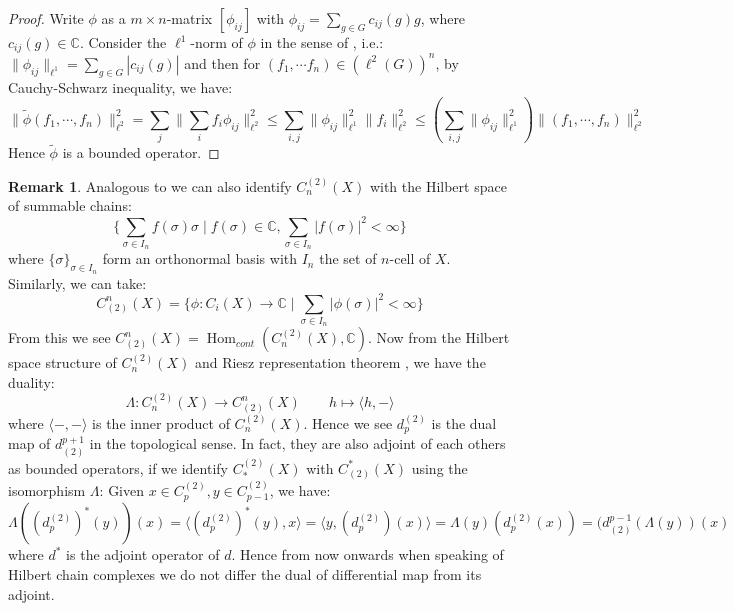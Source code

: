 \documentclass[11pt]{report}
\theoremstyle{definition}
\newtheorem{Rmk}{Remark}[chapter]
\theoremstyle{plain}
\DeclareMathOperator{\Hom}{Hom}
\newcommand{\complex}{\mathbb{C}}
\newcommand{\brac}[1]{\langle #1 \rangle}
\newcommand{\norm}[1]{\lVert #1 \rVert}
\renewcommand{\tilde}{\widetilde}
\begin{document}
\begin{proof}
	Write $\phi$ as a $m\times n$-matrix $[\phi_{ij}]$ with $\phi_{ij}=\sum_{g\in G}c_{ij}(g)g$, where $c_{ij}(g)\in \complex$. Consider the $\ell^1$-norm of $\phi$ in the sense of , i.e.: $\norm{\phi_{ij}}_{\ell^1}=\sum_{g\in G}|c_{ij}(g)|$ and then for $(f_1, \cdots f_n)\in (\ell^2(G))^n$, by Cauchy-Schwarz inequality, we have:
	\begin{equation*}
	\norm{\tilde{\phi}(f_1, \cdots, f_n)}_{\ell^2}^2=\sum_j\norm{\sum_i f_i\phi_{ij}}^2_{\ell^2}\leq \sum_{i,j}\norm{\phi_{ij}}^2_{\ell^1}\norm{f_i}^2_{\ell^2}\leq (\sum_{i,j}\norm{\phi_{ij}}^2_{\ell^1})\norm{(f_1, \cdots, f_n)}^2_{\ell^2}
	\end{equation*}
	Hence $\tilde{\phi}$ is a bounded operator. 
\end{proof}
\begin{Rmk}\label{ell2fct2}
	Analogous to  we can also identify $C^{(2)}_n(X)$ with the Hilbert space of summable chains:
	\begin{equation}
	\{\sum_{\sigma\in I_n}f(\sigma)\sigma\mid f(\sigma)\in \complex, \sum_{\sigma\in I_n} |f(\sigma)|^2<\infty\}
	\end{equation}
	where $\{\sigma\}_{\sigma\in I_n}$ form an orthonormal basis with $I_n$ the set of $n$-cell of $X$. Similarly, we can take:
	\begin{equation}
	C^n_{(2)}(X)=\{\phi:C_i(X)\to \complex\mid \sum_{\sigma\in I_n}|\phi(\sigma)|^2<\infty\}
	\end{equation}
	From this we see $C^n_{(2)}(X)=\Hom_{cont}(C_n^{(2)}(X), \complex)$. Now from the Hilbert space structure of $C_n^{(2)}(X)$ and Riesz representation theorem \cite[Chapter~I, Theorem~3.4]{conway2013}, we have the duality:
	\begin{equation}
	\Lambda: C^{(2)}_n(X)\to C^n_{(2)}(X)\qquad h\mapsto \brac{h,-}
	\end{equation}
	where $\brac{-,-}$ is the inner product of $C^{(2)}_n(X)$. Hence we see $d_p^{(2)}$ is the dual map of $d^{p+1}_{(2)}$ in the topological sense. In fact, they are also adjoint of each others as bounded operators, if we identify $C^{(2)}_*(X)$ with $C_{(2)}^*(X)$ using the isomorphism $\Lambda$: Given $x\in C^{(2)}_p, y\in C^{(2)}_{p-1}$, we have:
\begin{equation}
\Lambda((d_p^{(2)})^*(y))(x)=\brac{(d_p^{(2)})^*(y),x}=\brac{y,(d_p^{(2)})(x)}=\Lambda(y)(d_p^{(2)}(x))=(d^{p-1}_{(2)}(\Lambda(y))(x)
\end{equation}
where $d^*$ is the adjoint operator of $d$. Hence from now onwards when speaking of Hilbert chain complexes we do not differ the dual of differential map from its adjoint.
\end{Rmk}
\end{document}
